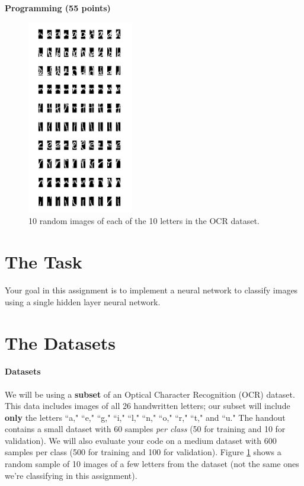 \documentclass[11pt,addpoints,answers]{exam}
\begin{document}
{\LARGE \bf Programming (55 points)}

\begin{figure}[H]
    \centering
    \captionsetup{justification=centering, margin=2cm}
    \includegraphics[width=4.6cm,height=8.5cm]{img/lettergrid.png}
    \caption{10 random images of each of the 10 letters in the OCR dataset.}
    \label{fig:grid}
\end{figure}

\section{The Task}
Your goal in this assignment is to implement a neural network to classify images using a single hidden layer neural network.

\section{The Datasets}
\label{sec:dataset}

\paragraph{Datasets} We will be using a \textbf{subset} of an Optical Character Recognition (OCR) dataset. This data includes images of all 26 handwritten letters; our subset will include \textbf{only} the letters ``a," ``e," ``g," ``i," ``l," ``n," ``o," ``r," ``t," and ``u."  The handout contains a small dataset with 60 samples \textit{per class} (50 for training and 10 for validation). We will also evaluate your code on a medium dataset with 600 samples per class (500 for training and 100 for validation). Figure \ref{fig:grid} shows a random sample of 10 images of a few letters from the dataset (not the same ones we're classifying in this assignment).
\end{document}

